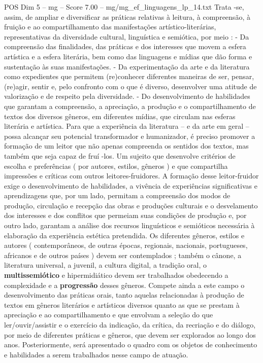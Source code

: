 \begin{textsample}{POS Dim 5 – mg – Score 7.00 – mg/mg\_ef\_linguagens\_lp\_14.txt}
Trata -se, assim, de ampliar e diversificar as práticas relativas à leitura, à compreensão, à fruição e ao compartilhamento das manifestações artístico-literárias, representativas da diversidade cultural, linguística e semiótica, por meio : - Da compreensão das finalidades, das práticas e dos interesses que movem a esfera artística e a esfera literária, bem como das linguagens e mídias que dão forma e sustentação às suas manifestações. - Da experimentação da arte e da literatura como expedientes que permitem (re)conhecer diferentes maneiras de ser, pensar, (re)agir, sentir e, pelo confronto com o que é diverso, desenvolver uma atitude de valorização e de respeito pela diversidade. - Do desenvolvimento de habilidades que garantam a compreensão, a apreciação, a produção e o compartilhamento de textos dos diversos gêneros, em diferentes mídias, que circulam nas esferas literária e artística.
Para que a experiência da literatura – e da arte em geral – possa alcançar seu potencial transformador e humanizador, é preciso promover a formação de um leitor que não apenas compreenda os sentidos dos textos, mas também que seja capaz de fruí -los.
Um sujeito que desenvolve critérios de escolha e preferências ( por autores, estilos, gêneros ) e que compartilha impressões e críticas com outros leitores-fruidores.
A formação desse leitor-fruidor exige o desenvolvimento de habilidades, a vivência de experiências significativas e aprendizagens que, por um lado, permitam a compreensão dos modos de produção, circulação e recepção das obras e produções culturais e o desvelamento dos interesses e dos conflitos que permeiam suas condições de produção e, por outro lado, garantam a análise dos recursos linguísticos e semióticos necessária à elaboração da experiência estética pretendida.
Os diferentes gêneros, estilos e autores ( contemporâneos, de outras épocas, regionais, nacionais, portugueses, africanos e de outros países ) devem ser contemplados ; também o cânone, a literatura universal, a juvenil, a cultura digital, a tradição oral, o \textbf{multissemiótico} e hipermidiático devem ser trabalhados obedecendo a complexidade e a \textbf{progressão} desses gêneros.
Compete ainda a este campo o desenvolvimento das práticas orais, tanto aquelas relacionadas à produção de textos em gêneros literários e artísticos diversos quanto as que se prestam à apreciação e ao compartilhamento e que envolvam a seleção do que ler/ouvir/assistir e o exercício da indicação, da crítica, da recriação e do diálogo, por meio de diferentes práticas e gêneros, que devem ser explorados ao longo dos anos.
Posteriormente, será apresentado o quadro com os objetos de conhecimento e habilidades a serem trabalhados nesse campo de atuação.

\end{textsample}

